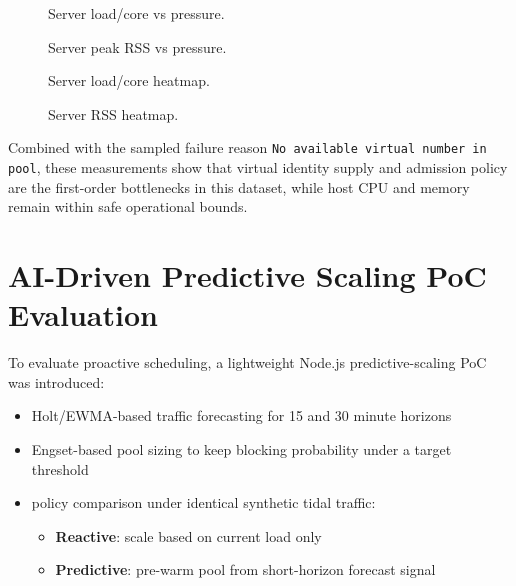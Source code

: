 \documentclass[12pt,a4paper]{report}
\newcommand{\MatrixChartsDir}{../data/matrix-1775300745300/charts}
\begin{document}
\begin{figure}[H]
\centering

\caption{Server load/core vs pressure.}
\label{fig:server-load-line}
\end{figure}

\begin{figure}[H]
\centering

\caption{Server peak RSS vs pressure.}
\label{fig:server-rss-line}
\end{figure}

\begin{figure}[H]
\centering

\caption{Server load/core heatmap.}
\label{fig:server-load-heatmap}
\end{figure}

\begin{figure}[H]
\centering

\caption{Server RSS heatmap.}
\label{fig:server-rss-heatmap}
\end{figure}

Combined with the sampled failure reason \texttt{No available virtual number in pool}, these measurements show that virtual identity supply and admission policy are the first-order bottlenecks in this dataset, while host CPU and memory remain within safe operational bounds.

\section{AI-Driven Predictive Scaling PoC Evaluation}
\label{sec:predictive-scaling-poc}
To evaluate proactive scheduling, a lightweight Node.js predictive-scaling PoC was introduced:
\begin{itemize}
  \item Holt/EWMA-based traffic forecasting for 15 and 30 minute horizons
  \item Engset-based pool sizing to keep blocking probability under a target threshold
  \item policy comparison under identical synthetic tidal traffic:
  \begin{itemize}
    \item \textbf{Reactive}: scale based on current load only
    \item \textbf{Predictive}: pre-warm pool from short-horizon forecast signal
  \end{itemize}
\end{itemize}
\end{document}
